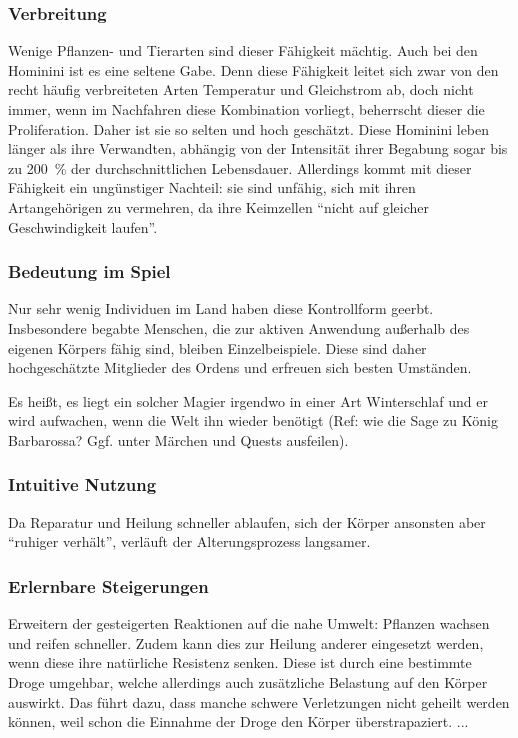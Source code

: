 \subsubsection{Verbreitung}
Wenige Pflanzen- und Tierarten sind dieser Fähigkeit mächtig. 
Auch bei den Hominini ist es eine seltene Gabe. 
Denn diese Fähigkeit leitet sich zwar von den recht häufig verbreiteten Arten Temperatur und Gleichstrom ab, doch nicht immer, wenn im Nachfahren diese Kombination vorliegt, beherrscht dieser die Proliferation.
Daher ist sie so selten und hoch geschätzt.
Diese Hominini leben länger als ihre Verwandten, abhängig von der Intensität ihrer Begabung sogar bis zu \SI{200}{\percent} der durchschnittlichen Lebensdauer.
Allerdings kommt mit dieser Fähigkeit ein ungünstiger Nachteil: sie sind unfähig, sich mit ihren Artangehörigen zu vermehren, da ihre Keimzellen "`nicht auf gleicher Geschwindigkeit laufen"'.

\subsubsection{Bedeutung im Spiel}
Nur sehr wenig Individuen im Land haben diese Kontrollform geerbt.
Insbesondere begabte Menschen, die zur aktiven Anwendung außerhalb des eigenen Körpers fähig sind, bleiben Einzelbeispiele.
Diese sind daher hochgeschätzte Mitglieder des Ordens und erfreuen sich besten Umständen.

Es heißt, es liegt ein solcher Magier irgendwo in einer Art Winterschlaf und er wird aufwachen, wenn die Welt ihn wieder benötigt (Ref: wie die Sage zu König Barbarossa? Ggf. unter Märchen und Quests ausfeilen). %

\subsubsection{Intuitive Nutzung}
Da Reparatur und Heilung schneller ablaufen, sich der Körper ansonsten aber "`ruhiger verhält"', verläuft der Alterungsprozess langsamer.

\subsubsection{Erlernbare Steigerungen}
\begin{outline}
	\1 Erweitern der gesteigerten Reaktionen auf die nahe Umwelt: Pflanzen wachsen und reifen schneller.
	\1 Zudem kann dies zur Heilung anderer eingesetzt werden, wenn diese ihre natürliche Resistenz senken.
	Diese ist durch eine bestimmte Droge umgehbar, welche allerdings auch zusätzliche Belastung auf den Körper auswirkt. %
	Das führt dazu, dass manche schwere Verletzungen nicht geheilt werden können, weil schon die Einnahme der Droge den Körper überstrapaziert.
	\1 ...
\end{outline}

